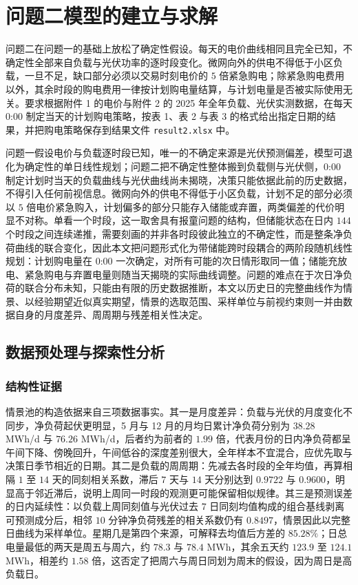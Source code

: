 \section{问题二模型的建立与求解}

问题二在问题一的基础上放松了确定性假设。每天的电价曲线相同且完全已知，不确定性全部来自负载与光伏功率的逐时段变化。微网向外的供电不得低于小区负载，一旦不足，缺口部分必须以交易时刻电价的 $5$ 倍紧急购电；除紧急购电费用以外，其余时段的购电费用一律按计划购电量结算，与计划电量是否被实际使用无关。要求根据附件 1 的电价与附件 2 的 2025 年全年负载、光伏实测数据，在每天 0:00 制定当天的计划购电策略，按表 1、表 2 与表 3 的格式给出指定日期的结果，并把购电策略保存到结果文件 \texttt{result2.xlsx} 中。

问题一假设电价与负载逐时段已知，唯一的不确定来源是光伏预测偏差，模型可退化为确定性的单日线性规划；问题二把不确定性整体搬到负载侧与光伏侧，0:00 制定计划时当天的负载曲线与光伏曲线尚未揭晓，决策只能依据此前的历史数据，不得引入任何前视信息。微网向外的供电不得低于小区负载，计划不足的部分必须以 $5$ 倍电价紧急购入，计划偏多的部分只能存入储能或弃置，两类偏差的代价明显不对称。单看一个时段，这一取舍具有报童问题\cite{khouja}的结构，但储能状态在日内 $144$ 个时段之间连续递推，需要刻画的并非各时段彼此独立的不确定性，而是整条净负荷曲线的联合变化，因此本文把问题形式化为带储能跨时段耦合的两阶段随机线性规划\cite{birge,liu}：计划购电量在 0:00 一次确定，对所有可能的次日情形取同一值；储能充放电、紧急购电与弃置电量则随当天揭晓的实际曲线调整。问题的难点在于次日净负荷的联合分布未知，只能由有限的历史数据推断，本文以历史日的完整曲线作为情景、以经验期望近似真实期望，情景的选取范围、采样单位与前视约束则一并由数据自身的月度差异、周周期与残差相关性决定。

\subsection{数据预处理与探索性分析}

\subsubsection{结构性证据}

情景池的构造依据来自三项数据事实。其一是月度差异：负载与光伏的月度变化不同步，净负荷起伏更明显，5 月与 12 月的月均日累计净负荷分别为 $38.28$ MWh/d 与 $76.26$ MWh/d，后者约为前者的 $1.99$ 倍，代表月份的日内净负荷都呈午间下降、傍晚回升，午间低谷的深度差别很大，全年样本不宜混合，应优先取与决策日季节相近的日期。其二是负载的周周期：先减去各时段的全年均值，再算相隔 $1$ 至 $14$ 天的同刻相关系数，滞后 $7$ 天与 $14$ 天分别达到 $0.9722$ 与 $0.9600$，明显高于邻近滞后，说明上周同一时段的观测更可能保留相似规律。其三是预测误差的日内延续性：以负载上周同刻值与光伏过去 $7$ 日同刻均值构成的组合基线剥离可预测成分后，相邻 $10$ 分钟净负荷残差的相关系数仍有 $0.8497$，情景因此以完整日曲线为采样单位。星期几是第四个来源，可解释去均值后方差的 $85.28\%$；日总电量最低的两天是周五与周六，约 $78.3$ 与 $78.4$ MWh，其余五天约 $123.9$ 至 $124.1$ MWh，相差约 $1.58$ 倍，这否定了把周六与周日同划为周末的假设，因为周日是高负载日。

